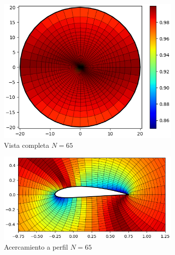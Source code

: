 \documentclass[letterpaper, openright, 12pt]{book}
\begin{document}
    \begin{figure}[htbp!]
        \centering
        \begin{subfigure}[c]{0.48\textwidth}
            \includegraphics[keepaspectratio,
                width=0.99\textwidth]{./img/naca4415_n_65_skew_far}
            \caption{Vista completa $N=65$}
            \label{fig:naca4415_n_65_skew_far}
        \end{subfigure}
        \hfill
        \begin{subfigure}[c]{0.48\textwidth}
            \includegraphics[keepaspectratio,
                width=0.99\textwidth]{./img/naca4415_n_65_skew_close}
            \caption{Acercamiento a perfil $N=65$}
            \label{fig:naca4415_n_65_skew_close}
        \end{subfigure}
        \begin{subfigure}[c]{0.48\textwidth}

\end{subfigure}
\end{figure}
\end{document}
